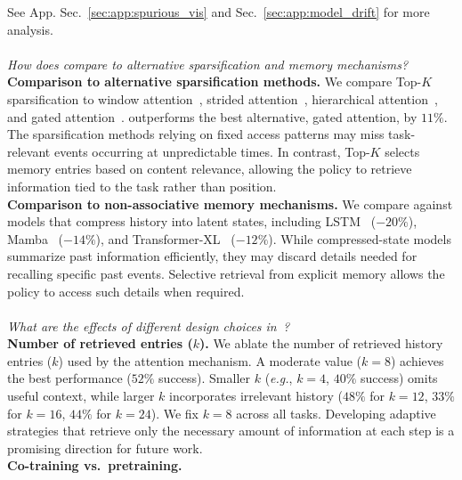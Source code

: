See App. Sec.~\ref{sec:app:spurious_vis} and Sec.~\ref{sec:app:model_drift} for more analysis.
\\
\\
\textit{How does \ourmethod{} compare to alternative sparsification and memory mechanisms?}
\vspace{0.5em}
\\
\textbf{Comparison to alternative sparsification methods.}
We compare Top-$K$ sparsification to window attention~\cite{child2019generating}, strided attention~\cite{child2019generating}, hierarchical attention~\cite{beltagy2020longformer}, and gated attention~\cite{gatedattention}.
\ourmethod{} outperforms the best alternative, gated attention, by $11\%$.
The sparsification methods relying on fixed access patterns may miss task-relevant events occurring at unpredictable times.
In contrast, Top-$K$ selects memory entries based on content relevance, allowing the policy to retrieve information tied to the task rather than position.
\\
\textbf{Comparison to non-associative memory mechanisms.}
We compare against models that compress history into latent states, including LSTM~\cite{lstm} ($-20\%$), Mamba~\cite{mamba} ($-14\%$), and Transformer-XL~\cite{dai2019transformer} ($-12\%$).
While compressed-state models summarize past information efficiently, they may discard details needed for recalling specific past events.
Selective retrieval from explicit memory allows the policy to access such details when required.
\\
\\
\textit{What are the effects of different design choices in~\ourmethod{}?}
\vspace{0.5em}
\\
\textbf{Number of retrieved entries ($k$).}
% 
We ablate the number of retrieved history entries ($k$) used by the attention mechanism. A moderate value ($k=8$) achieves the best performance ($52\%$ success). Smaller $k$ (\textit{e.g.}, $k=4$, $40\%$ success) omits useful context, while larger $k$ incorporates irrelevant history ($48\%$ for $k=12$, $33\%$ for $k=16$, $44\%$ for $k=24$). We fix $k=8$ across all tasks. Developing adaptive strategies that retrieve only the necessary amount of information at each step is a promising direction for future work.
\\
\textbf{Co-training vs.\ pretraining.}
% 
